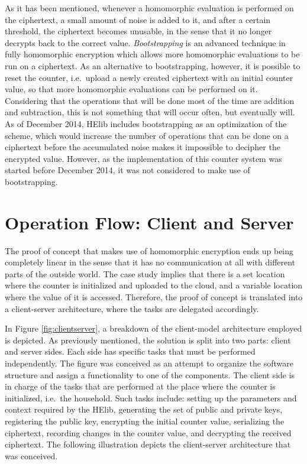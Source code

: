As it has been mentioned, whenever a homomorphic evaluation is performed on the ciphertext, a small amount of noise is added to it, and after a certain threshold, the ciphertext becomes unusable, in the sense that it no longer decrypts back to the correct value. \emph{Bootstrapping} is an advanced technique in fully homomorphic encryption which allows more homomorphic evaluations to be run on a ciphertext. As an alternative to bootstrapping, however, it is possible to reset the counter, i.e.\ upload a newly created ciphertext with an initial counter value, so that more homomorphic evaluations can be performed on it.  Considering that the operations that will be done most of the time are addition and subtraction, this is not something that will occur often, but eventually will. As of December 2014, HElib includes bootstrapping as an optimization of the scheme, which would increase the number of operations that can be done on a ciphertext before the accumulated noise makes it impossible to decipher the encrypted value. However, as the implementation of this counter system was started before December 2014, it was not considered to make use of bootstrapping.

\section{{Operation Flow: Client and Server}}

The proof of concept that makes use of homomorphic encryption ends up being completely linear in the sense that it has no communication at all with different parts of the outside world. The case study implies that there is a set location where the counter is initialized and uploaded to the cloud, and a variable location where the value of it is accessed. Therefore, the proof of concept is translated into a client-server architecture, where the tasks are delegated accordingly. 

In Figure \ref{fig:clientserver}, a breakdown of the client-model architecture employed is depicted. As previously mentioned, the solution is split into two parts: client and server sides. Each side has specific tasks that must be performed independently. The figure was conceived as an attempt to organize the software structure and assign a functionality to one of the components. The client side is in charge of the tasks that are performed at the place where the counter is initialized, i.e.\ the household. Such tasks include: setting up the parameters and context required by the HElib, generating the set of public and private keys, registering the public key, encrypting the initial counter value, serializing the ciphertext, recording changes in the counter value, and decrypting the received ciphertext. The following illustration depicts the client-server architecture that was conceived. 

